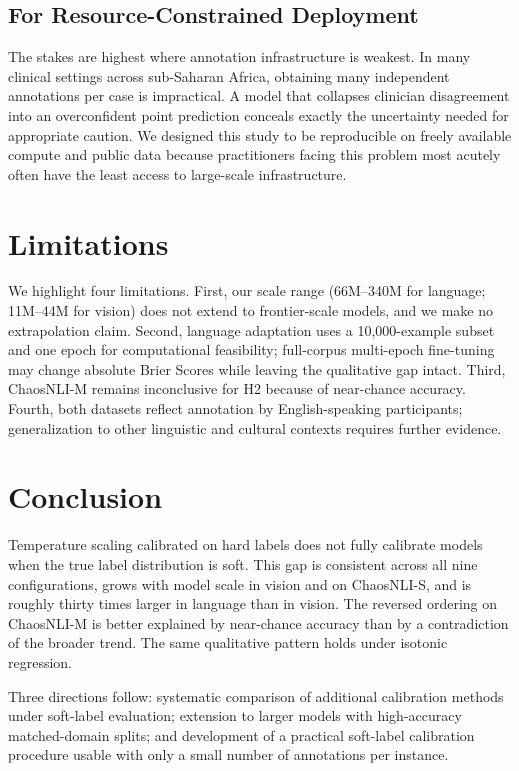 \documentclass[11pt,a4paper]{article}
\theoremstyle{definition}
\begin{document}
\subsection{For Resource-Constrained Deployment}

The stakes are highest where annotation infrastructure is weakest. In
many clinical settings across sub-Saharan Africa, obtaining many
independent annotations per case is impractical. A model that collapses
clinician disagreement into an overconfident point prediction conceals
exactly the uncertainty needed for appropriate caution. We designed this
study to be reproducible on freely available compute and public data
because practitioners facing this problem most acutely often have the
least access to large-scale infrastructure.

\section{Limitations}

We highlight four limitations. First, our scale range (66M--340M for
language; 11M--44M for vision) does not extend to frontier-scale models,
and we make no extrapolation claim. Second, language adaptation uses a
10{,}000-example subset and one epoch for computational feasibility;
full-corpus multi-epoch fine-tuning may change absolute Brier Scores
while leaving the qualitative gap intact. Third, ChaosNLI-M remains
inconclusive for H2 because of near-chance accuracy. Fourth, both
datasets reflect annotation by English-speaking participants;
generalization to other linguistic and cultural contexts requires
further evidence.

\section{Conclusion}

Temperature scaling calibrated on hard labels does not fully calibrate
models when the true label distribution is soft. This gap is consistent
across all nine configurations, grows with model scale in vision and on
ChaosNLI-S, and is roughly thirty times larger in language than in
vision. The reversed ordering on ChaosNLI-M is better explained by
near-chance accuracy than by a contradiction of the broader trend. The
same qualitative pattern holds under isotonic regression.

Three directions follow: systematic comparison of additional calibration
methods under soft-label evaluation; extension to larger models with
high-accuracy matched-domain splits; and development of a practical
soft-label calibration procedure usable with only a small number of
annotations per instance.
\end{document}
